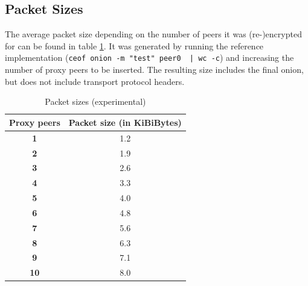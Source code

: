 \subsection{Packet Sizes}
The average packet size depending on the number of peers it was
(re-)encrypted for can be found in table \ref{pkgsizes}.
It was generated by running the reference implementation
(\verb=ceof onion -m "test" peer0  | wc -c=)
and increasing the number of proxy peers to be inserted.
The resulting size includes the final onion, 
but does not include transport protocol headers.
\begin{longtable}{|c|c|}
\caption{Packet sizes (experimental)}
\label{pkgsizes}\\
\hline
\textbf{Proxy peers} & \textbf{Packet size (in KiBiBytes)}\\
\hline
\textbf{1} & 1.2\\
\hline
\textbf{2} & 1.9\\
\hline
\textbf{3} & 2.6\\
\hline
\textbf{4} & 3.3\\
\hline
\textbf{5} & 4.0\\
\hline
\textbf{6} & 4.8\\
\hline
\textbf{7} & 5.6\\
\hline
\textbf{8} & 6.3\\
\hline
\textbf{9} & 7.1\\
\hline
\textbf{10} & 8.0\\
\hline
\end{longtable}
